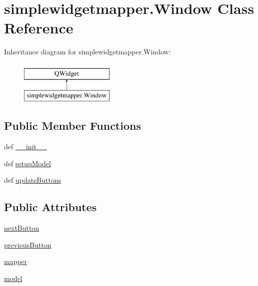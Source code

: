 \hypertarget{classsimplewidgetmapper_1_1Window}{}\section{simplewidgetmapper.\+Window Class Reference}
\label{classsimplewidgetmapper_1_1Window}
Inheritance diagram for simplewidgetmapper.\+Window\+:\begin{figure}[H]
\begin{center}
\leavevmode
\includegraphics[height=2.000000cm]{classsimplewidgetmapper_1_1Window}
\end{center}
\end{figure}
\subsection*{Public Member Functions}
\begin{DoxyCompactItemize}
\item 
def \hyperlink{classsimplewidgetmapper_1_1Window_ac1a6196bba627a64bf7c33d6daa1c20f}{\+\_\+\+\_\+init\+\_\+\+\_\+}
\item 
def \hyperlink{classsimplewidgetmapper_1_1Window_a35c7edafef7e631765f1c00745bb39c3}{setup\+Model}
\item 
def \hyperlink{classsimplewidgetmapper_1_1Window_ac527aa71aad1907717eedadb59dee5d9}{update\+Buttons}
\end{DoxyCompactItemize}
\subsection*{Public Attributes}
\begin{DoxyCompactItemize}
\item 
\hyperlink{classsimplewidgetmapper_1_1Window_a091914580ce25875826ab1b181a37c02}{next\+Button}
\item 
\hyperlink{classsimplewidgetmapper_1_1Window_abe0c3d47c1b20f1accb91a7a4ab1d6a9}{previous\+Button}
\item 
\hyperlink{classsimplewidgetmapper_1_1Window_ab78e5ce3c5d49a9a83775060015f5c7f}{mapper}
\item 
\hyperlink{classsimplewidgetmapper_1_1Window_a796c39c52b77d212bef75ec2c946efdb}{model}
\end{DoxyCompactItemize}


